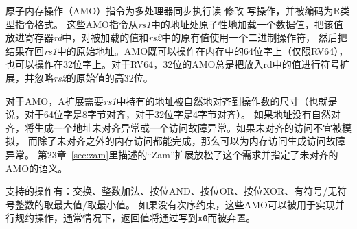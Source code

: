 \vspace{-0.1in} 原子内存操作（AMO）指令为多处理器同步执行读-修改-写操作，并被编码为R类型指令格式。
这些AMO指令从{\em rs1}中的地址处原子性地加载一个数据值，把该值放进寄存器{\em rd}中，对被加载的值和{\em rs2}中的原有值使用一个二进制操作符，
然后把结果存回{\em rs1}中的原始地址。AMO既可以操作在内存中的64位字上（仅限RV64），
也可以操作在32位字上。对于RV64，32位的AMO总是把放入rd中的值进行符号扩展，并忽略{\em rs2}的原始值的高32位。

对于AMO，A扩展需要{\em rs1}中持有的地址被自然地对齐到操作数的尺寸（也就是说，对于64位字是8字节对齐，对于32位字是4字节对齐）。
如果地址没有自然对齐，将生成一个地址未对齐异常或一个访问故障异常。如果未对齐的访问不宜被模拟，
而除了未对齐之外的内存访问都能完成，那么可以为内存访问生成访问故障异常。
第23章~\ref{sec:zam}里描述的“Zam”扩展放松了这个需求并指定了未对齐的AMO的语义。

支持的操作有：交换、整数加法、按位AND、按位OR、按位XOR、有符号/无符号整数的取最大值/取最小值。
如果没有次序约束，这些AMO可以被用于实现并行规约操作，通常情况下，返回值将通过写到{\tt x0}而被弃置。

